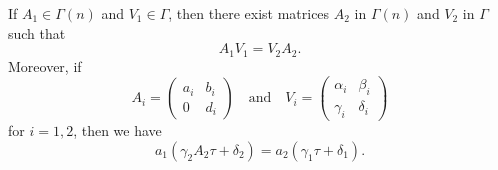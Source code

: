If $A_1 \in \Gamma(n)$ and $V_1 \in \Gamma$, then there exist matrices $A_2$ in $\Gamma(n)$ and $V_2$ in $\Gamma$ such that
$$A_1 V_1 = V_2 A_2.$$
Moreover, if
$$A_i = \begin{pmatrix} a_i & b_i \\ 0 & d_i \end{pmatrix} \quad \text{and} \quad V_i = \begin{pmatrix} \alpha_i & \beta_i \\ \gamma_i & \delta_i \end{pmatrix}$$
for $i = 1, 2$, then we have
$$a_1 (\gamma_2 A_2 \tau + \delta_2) = a_2 (\gamma_1 \tau + \delta_1).$$
